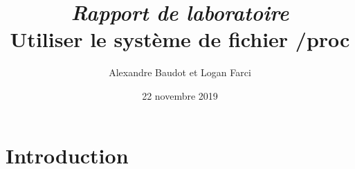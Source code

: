 \documentclass[french, a4, 10pt]{article} %
\begin{document}
\lhead{ } %
\cfoot{ } %
\rfoot{\thepage} %
\renewcommand{\headrulewidth}{0.4pt} 
\renewcommand{\footrulewidth}{0.4pt} 
\setcounter{tocdepth}{1}    %
\setcounter{secnumdepth}{5} %
\title{\emph{\textbf{Rapport de laboratoire}}\\Utiliser le système de fichier /proc}
\author{Alexandre Baudot et Logan Farci}
\date{22 novembre 2019}
\maketitle
\tableofcontents
\section{Introduction}



\printindex			%
\end{document}
